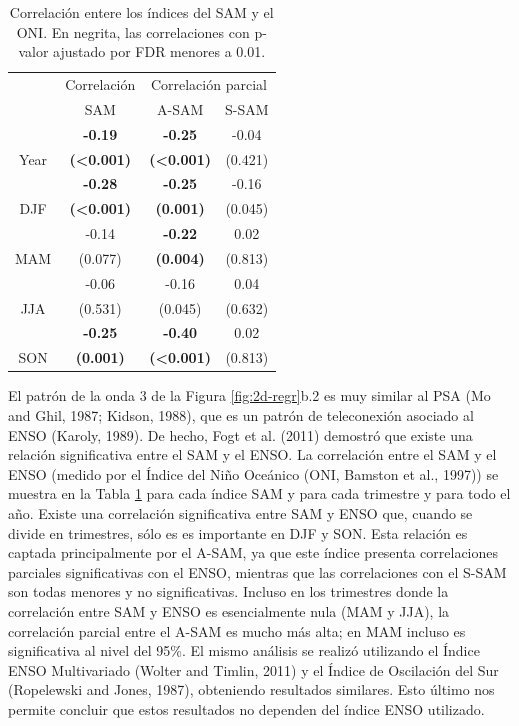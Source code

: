 \documentclass[12pt,oneside]{reedthesis}
\begin{document}
\begin{table}

\caption{\label{tab:enso-cor-table}Correlación entere los índices del SAM y el ONI.
En negrita, las correlaciones con p-valor ajustado por FDR menores a 0.01.}
\centering
\begin{tabular}[t]{c>{}c>{}c>{}c}
\toprule
\multicolumn{1}{c}{ } & \multicolumn{1}{c}{Correlación} & \multicolumn{2}{c}{Correlación parcial} \\
\cmidrule(l{3pt}r{3pt}){2-2} \cmidrule(l{3pt}r{3pt}){3-4}
 & SAM & A-SAM & S-SAM\\
\midrule
 & \textbf{-0.19} & \textbf{-0.25} & -0.04\\
\cmidrule{2-4}
\multirow[t]{-2}{*}{\centering\arraybackslash Year} & \textbf{(<0.001)} & \textbf{(<0.001)} & (0.421)\\
\cmidrule{1-4}
 & \textbf{-0.28} & \textbf{-0.25} & -0.16\\
\cmidrule{2-4}
\multirow[t]{-2}{*}{\centering\arraybackslash DJF} & \textbf{(<0.001)} & \textbf{(0.001)} & (0.045)\\
\cmidrule{1-4}
 & -0.14 & \textbf{-0.22} & 0.02\\
\cmidrule{2-4}
\multirow[t]{-2}{*}{\centering\arraybackslash MAM} & (0.077) & \textbf{(0.004)} & (0.813)\\
\cmidrule{1-4}
 & -0.06 & -0.16 & 0.04\\
\cmidrule{2-4}
\multirow[t]{-2}{*}{\centering\arraybackslash JJA} & (0.531) & (0.045) & (0.632)\\
\cmidrule{1-4}
 & \textbf{-0.25} & \textbf{-0.40} & 0.02\\
\cmidrule{2-4}
\multirow[t]{-2}{*}{\centering\arraybackslash SON} & \textbf{(0.001)} & \textbf{(<0.001)} & (0.813)\\
\bottomrule
\end{tabular}
\end{table}

El patrón de la onda 3 de la Figura \ref{fig:2d-regr}b.2 es muy similar al PSA (Mo and Ghil, 1987; Kidson, 1988), que es un patrón de teleconexión asociado al ENSO (Karoly, 1989).
De hecho, Fogt et al. (2011) demostró que existe una relación significativa entre el SAM y el ENSO.
La correlación entre el SAM y el ENSO (medido por el Índice del Niño Oceánico (ONI, Bamston et al., 1997)) se muestra en la Tabla \ref{tab:enso-cor-table} para cada índice SAM y para cada trimestre y para todo el año.
Existe una correlación significativa entre SAM y ENSO que, cuando se divide en trimestres, sólo es es importante en DJF y SON.
Esta relación es captada principalmente por el A-SAM, ya que este índice presenta correlaciones parciales significativas con el ENSO, mientras que las correlaciones con el S-SAM son todas menores y no significativas.
Incluso en los trimestres donde la correlación entre SAM y ENSO es esencialmente nula (MAM y JJA), la correlación parcial entre el A-SAM es mucho más alta; en MAM incluso es significativa al nivel del 95\%.
El mismo análisis se realizó utilizando el Índice ENSO Multivariado (Wolter and Timlin, 2011) y el Índice de Oscilación del Sur (Ropelewski and Jones, 1987), obteniendo resultados similares.
Esto último nos permite concluir que estos resultados no dependen del índice ENSO utilizado.
\end{document}
